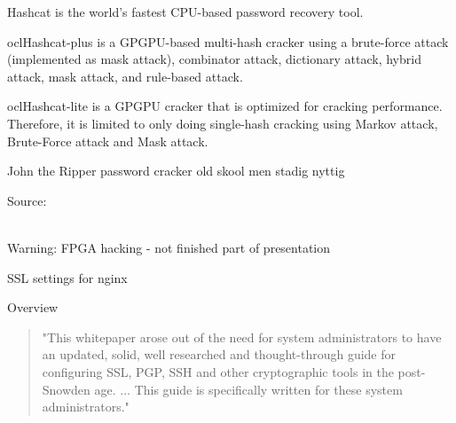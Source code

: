 \documentclass[20pt,landscape,a4paper]{foils}
\begin{document}

\begin{list2}
\item Hashcat is the world's fastest CPU-based password recovery tool.
\item oclHashcat-plus is a GPGPU-based multi-hash cracker using a brute-force attack (implemented as mask attack), combinator attack, dictionary attack, hybrid attack, mask attack, and rule-based attack.
\item oclHashcat-lite is a GPGPU cracker that is optimized for cracking performance. Therefore, it is limited to only doing single-hash cracking using Markov attack, Brute-Force attack and Mask attack.
\item John the Ripper password cracker old skool men stadig nyttig
\end{list2}

Source:\\
\\




Warning: FPGA hacking - not finished part of presentation





SSL settings for nginx

Overview
\begin{quote}
"This whitepaper arose out of the need for system administrators to have an updated,
solid, well researched and thought-through guide for configuring SSL, PGP, SSH and
other cryptographic tools in the post-Snowden age. ... This guide is specifically
written for these system administrators."
\end{quote}





\end{document}
